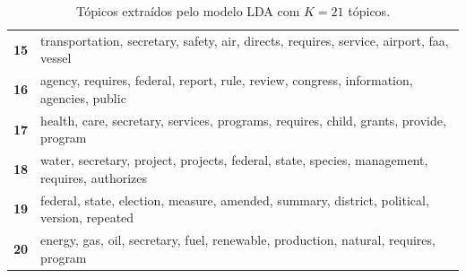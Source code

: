 \begin{table}[htpb]
\begin{tabularx}{\textwidth}{@{}l X@{}}
        \textbf{15} & transportation, secretary, safety, air, directs, requires, service, airport, faa, vessel \\
        \textbf{16} & agency, requires, federal, report, rule, review, congress, information, agencies, public \\
        \textbf{17} & health, care, secretary, services, programs, requires, child, grants, provide, program \\
        \textbf{18} & water, secretary, project, projects, federal, state, species, management, requires, authorizes \\
        \textbf{19} & federal, state, election, measure, amended, summary, district, political, version, repeated \\
        \textbf{20} & energy, gas, oil, secretary, fuel, renewable, production, natural, requires, program \\
        \bottomrule
    \end{tabularx}
    \caption{Tópicos extraídos pelo modelo LDA com $K=21$ tópicos.}
    \label{tab:topicos_lda_21}
\end{table}
